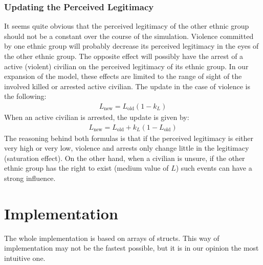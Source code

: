 \documentclass[11pt]{article}
\begin{document}
\subsubsection{Updating the Perceived Legitimacy}
It seems quite obvious that the perceived legitimacy of the other ethnic group should not be a constant over the course of the simulation. Violence committed by one ethnic group will probably decrease its perceived legitimacy in the eyes of the other ethnic group. The opposite effect will possibly have the arrest of a active (violent) civilian on the perceived legitimacy of its ethnic group. In our expansion of the model, these effects are limited to the range of sight of the involved killed or arrested active civilian. The update in the case of violence is the following:
\begin{align}
L_{\text{new}} = L_{\text{old}} \left( 1 - k_L \right)
\end{align}
When an active civilian is arrested, the update is given by:
\begin{align}
L_{\text{new}} = L_{\text{old}} + k_L \left( 1 - L_{\text{old}} \right)
\end{align}
The reasoning behind both formulas is that if the perceived legitimacy is either very high or very low, violence and arrests only change little in the legitimacy (saturation effect). On the other hand, when a civilian is unsure, if the other ethnic group has the right to exist (medium value of $L$) such events can have a strong influence.

\section{Implementation}
The whole implementation is based on arrays of structs. This way of implementation may not be the fastest possible, but it is in our opinion the most intuitive one.
\end{document}
